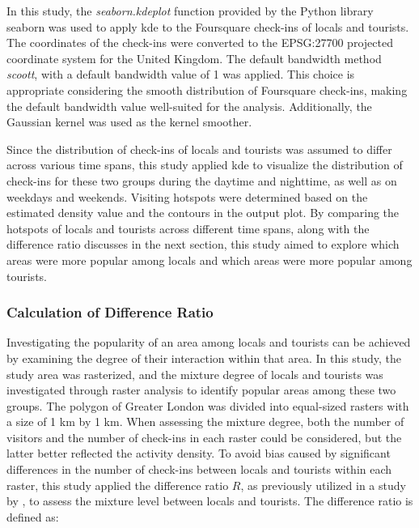 \documentclass{article}
\theoremstyle{definition}
\theoremstyle{remark}
\begin{document}
In this study, the \textit{seaborn.kdeplot} function provided by the Python library seaborn \citep{waskom_seaborn_2021} was used to apply \acrshort{kde} to the Foursquare check-ins of locals and tourists. The coordinates of the check-ins were converted to the EPSG:27700 projected coordinate system for the United Kingdom. The default bandwidth method \textit{scoott}, with a default bandwidth value of 1 was applied. This choice is appropriate considering the smooth distribution of Foursquare check-ins, making the default bandwidth value well-suited for the analysis. Additionally, the Gaussian kernel was used as the kernel smoother.

Since the distribution of check-ins of locals and tourists was assumed to differ across various time spans, this study applied \acrshort{kde} to visualize the distribution of check-ins for these two groups during the daytime and nighttime, as well as on weekdays and weekends. Visiting hotspots were determined based on the estimated density value and the contours in the output plot. By comparing the hotspots of locals and tourists across different time spans, along with the difference ratio discusses in the next section, this study aimed to explore which areas were more popular among locals and which areas were more popular among tourists.


\subsubsection{Calculation of Difference Ratio}
Investigating the popularity of an area among locals and tourists can be achieved by examining the degree of their interaction within that area. In this study, the study area was rasterized, and the mixture degree of locals and tourists was investigated through raster analysis to identify popular areas among these two groups. The polygon of Greater London was divided into equal-sized rasters with a size of 1 km by 1 km. When assessing the mixture degree, both the number of visitors and the number of check-ins in each raster could be considered, but the latter better reflected the activity density. To avoid bias caused by significant differences in the number of check-ins between locals and tourists within each raster, this study applied the difference ratio $R$, as previously utilized in a study by \cite{li_analyzing_2018}, to assess the mixture level between locals and tourists. The difference ratio is defined as:
\end{document}
